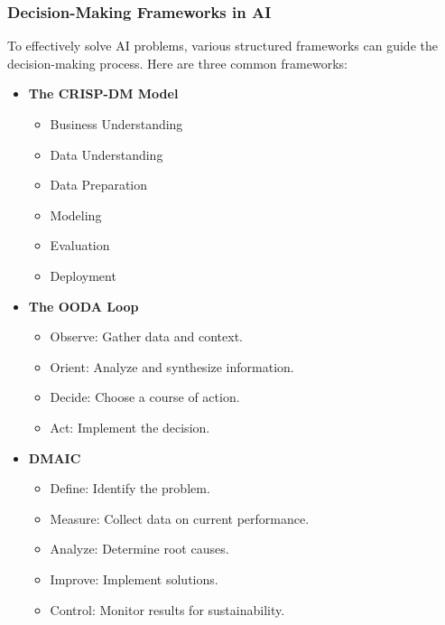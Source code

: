\documentclass[aspectratio=169]{beamer}
\begin{document}
\begin{frame}[fragile]
    \frametitle{Decision-Making Frameworks in AI}
    To effectively solve AI problems, various structured frameworks can guide the decision-making process. Here are three common frameworks:
    
    \begin{itemize}
        \item \textbf{The CRISP-DM Model}
        \begin{itemize}
            \item Business Understanding
            \item Data Understanding
            \item Data Preparation
            \item Modeling
            \item Evaluation
            \item Deployment
        \end{itemize}

        \item \textbf{The OODA Loop}
        \begin{itemize}
            \item Observe: Gather data and context.
            \item Orient: Analyze and synthesize information.
            \item Decide: Choose a course of action.
            \item Act: Implement the decision.
        \end{itemize}

        \item \textbf{DMAIC}
        \begin{itemize}
            \item Define: Identify the problem.
            \item Measure: Collect data on current performance.
            \item Analyze: Determine root causes.
            \item Improve: Implement solutions.
            \item Control: Monitor results for sustainability.
        \end{itemize}
    \end{itemize}
\end{frame}
\end{document}

